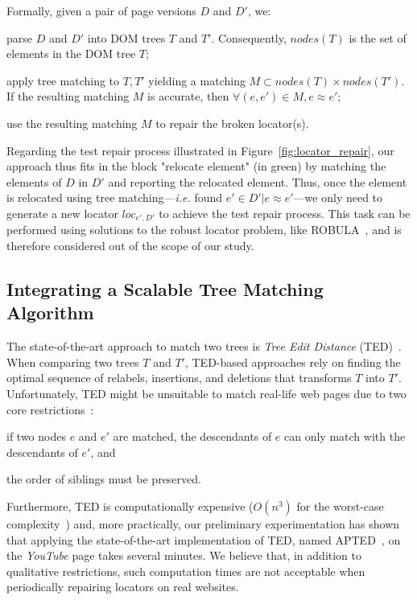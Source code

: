 Formally, given a pair of page versions $D$ and $D'$, we:
\begin{compactenum}
    \item parse $D$ and $D'$ into DOM trees $T$ and $T'$.
    Consequently, $nodes(T)$ is the set of elements in the DOM tree $T$;
    \item apply tree matching to $T, T'$ yielding a matching $M \subset nodes(T) \times nodes(T')$.
    If the resulting matching $M$ is accurate, then $\forall (e, e') \in M, e \approx e'$;
    \item use the resulting matching $M$ to repair the broken locator(s).
\end{compactenum}

Regarding the test repair process illustrated in Figure~\ref{fig:locator_repair}, our approach thus fits in the block "\textsf{relocate element}" (in green) by matching the elements of $D$ in $D'$ and reporting the relocated element. 
Thus, once the element is relocated using tree matching---\emph{i.e.} \erratum found $e' \in D'|e \approx e'$---we only need to generate a new locator $loc_{e', D'}$ to achieve the test repair process.
This task can be performed using solutions to the robust locator problem, like ROBULA~\cite{leotta2014reducing}, and is therefore considered out of the scope of our study.

\subsection{Integrating a Scalable Tree Matching Algorithm}
The state-of-the-art approach to match two trees is \emph{Tree Edit Distance} (TED)~\cite{tai1979tree}. 
When comparing two trees $T$ and $T'$, TED-based approaches rely on finding the optimal sequence of relabels, insertions, and deletions that transforms $T$ into $T'$.
Unfortunately, TED might be unsuitable to match real-life web pages due to two core restrictions~\cite{Kumar2011_FTM}:
\begin{inparaenum}
    \item if two nodes $e$ and $e'$ are matched, the descendants of $e$ can only match with the descendants of $e'$, and
    \item the order of siblings must be preserved.
\end{inparaenum}
Furthermore, TED is computationally expensive ($O(n^3)$ for the worst-case complexity~\cite{bringmann2018tree}) and, more practically, our preliminary experimentation has shown that applying the state-of-the-art implementation of TED, named APTED~\cite{pawlik2016tree}, on the \textit{YouTube} page takes several minutes. 
We believe that, in addition to qualitative restrictions, such computation times are not acceptable when periodically repairing locators on real websites.

